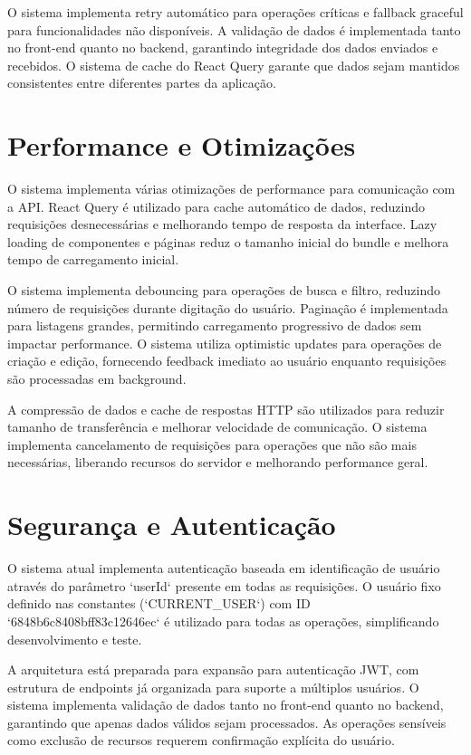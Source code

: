 \documentclass[12pt,a4paper]{article}
\begin{document}
O sistema implementa retry automático para operações críticas e fallback graceful para funcionalidades não disponíveis. A validação de dados é implementada tanto no front-end quanto no backend, garantindo integridade dos dados enviados e recebidos. O sistema de cache do React Query garante que dados sejam mantidos consistentes entre diferentes partes da aplicação.

\section{Performance e Otimizações}

O sistema implementa várias otimizações de performance para comunicação com a API. React Query é utilizado para cache automático de dados, reduzindo requisições desnecessárias e melhorando tempo de resposta da interface. Lazy loading de componentes e páginas reduz o tamanho inicial do bundle e melhora tempo de carregamento inicial.

O sistema implementa debouncing para operações de busca e filtro, reduzindo número de requisições durante digitação do usuário. Paginação é implementada para listagens grandes, permitindo carregamento progressivo de dados sem impactar performance. O sistema utiliza optimistic updates para operações de criação e edição, fornecendo feedback imediato ao usuário enquanto requisições são processadas em background.

A compressão de dados e cache de respostas HTTP são utilizados para reduzir tamanho de transferência e melhorar velocidade de comunicação. O sistema implementa cancelamento de requisições para operações que não são mais necessárias, liberando recursos do servidor e melhorando performance geral.

\section{Segurança e Autenticação}

O sistema atual implementa autenticação baseada em identificação de usuário através do parâmetro `userId` presente em todas as requisições. O usuário fixo definido nas constantes (`CURRENT_USER`) com ID `6848b6c8408bff83c12646ec` é utilizado para todas as operações, simplificando desenvolvimento e teste.

A arquitetura está preparada para expansão para autenticação JWT, com estrutura de endpoints já organizada para suporte a múltiplos usuários. O sistema implementa validação de dados tanto no front-end quanto no backend, garantindo que apenas dados válidos sejam processados. As operações sensíveis como exclusão de recursos requerem confirmação explícita do usuário.
\end{document}
